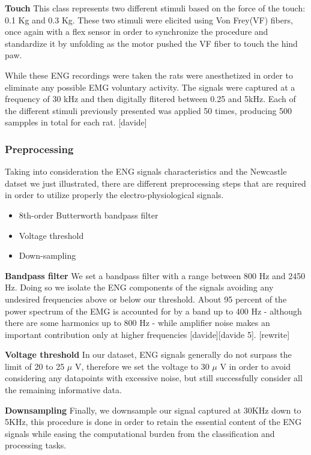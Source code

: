 \documentclass{Configuration_Files/PoliMi3i_thesis}
\begin{document}
\textbf{Touch} \quad This class represents two different stimuli based on the force of the touch: 0.1 Kg and 0.3 Kg.
These two stimuli were elicited using Von Frey(VF) fibers, once again with a flex sensor in order to synchronize the procedure and standardize it by unfolding as the motor pushed the VF fiber to touch the hind paw.

While these ENG recordings were taken the rats were anesthetized in order to eliminate any possible EMG voluntary activity. The signals were captured at a frequency of 30 kHz and then digitally flitered between 0.25 and 5kHz.
Each of the different stimuli previously presented was applied 50 times, producing 500 sampples in total for each rat. [davide]

\subsubsection{Preprocessing}

Taking into consideration the ENG signals characteristics and the Newcastle datset we just illustrated, there are different preprocessing steps that are required in order to utilize properly the electro-physiological signals.

\begin{itemize}
	\item 8th-order Butterworth bandpass filter
	\item Voltage threshold
	\item Down-sampling
\end{itemize}

\textbf{Bandpass filter} \quad We set a bandpass filter with a range between 800 Hz and 2450 Hz.
Doing so we isolate the ENG components of the signals avoiding any undesired frequencies above or below our threshold.
About 95 percent of the power spectrum of the EMG is accounted for by a band up to 400 Hz - although there are some harmonics up to 800 Hz - while amplifier noise makes an important contribution only at higher frequencies [davide][davide 5].
[rewrite]

\textbf{Voltage threshold} \quad In our dataset, ENG signals generally do not surpass the limit of 20 to 25 \(\mu \) V, therefore we set the voltage to 30 \(\mu \) V in order to avoid considering any datapoints with excessive noise, but still successfully consider all the remaining informative data.

\textbf{Downsampling} \quad Finally, we downsample our signal captured at 30KHz down to 5KHz, this procedure is done in order to retain the essential content of the ENG signals while easing the computational burden from the classification and processing tasks.
\end{document}
